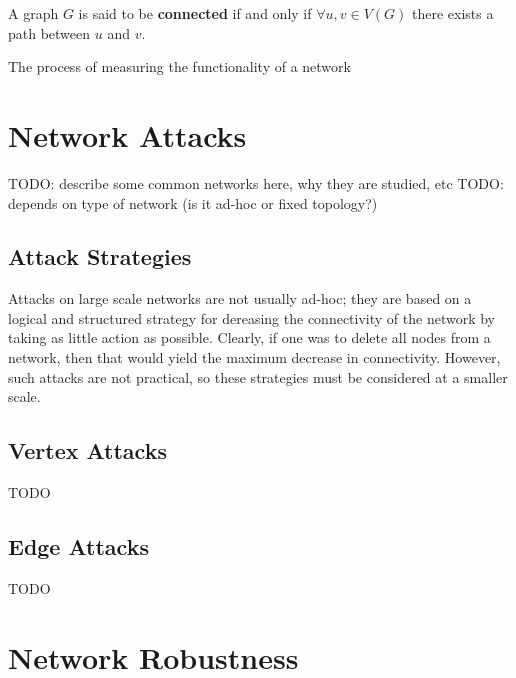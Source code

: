 \documentclass[11pt]{article}
\begin{document}
\begin{define}
A graph $G$ is said to be \textbf{connected} if and only if $\forall u,v \in V(G)$ there exists a path between $u$ and $v$.
\end{define}


The process of measuring the functionality of a network 

\section{Network Attacks}


TODO: describe some common networks here, why they are studied, etc
TODO: depends on type of network (is it ad-hoc or fixed topology?)

\subsection{Attack Strategies}
Attacks on large scale networks are not usually ad-hoc; they are based on a logical and structured strategy for dereasing the connectivity of the network by taking as little action as possible. Clearly, if one was to delete all nodes from a network, then that would yield the maximum decrease in connectivity. However, such attacks are not practical, so these strategies must be considered at a smaller scale.


\subsection{Vertex Attacks}
TODO

\subsection{Edge Attacks}
TODO

\section{Network Robustness}
\end{document}
